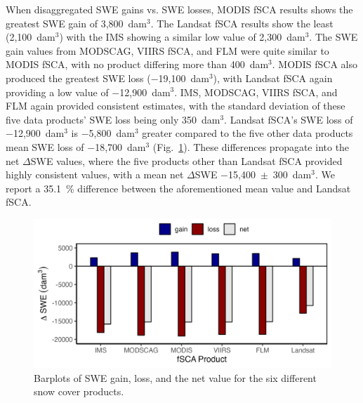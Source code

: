 \clearpage
When disaggregated SWE gains vs. SWE losses, MODIS fSCA results shows the greatest SWE gain of 3,800~dam$^{3}$. The Landsat fSCA results show the least (2,100~dam$^{3}$) with the IMS showing a similar low value of 2,300~dam$^{3}$. The SWE gain values from MODSCAG, VIIRS fSCA, and FLM were quite similar to MODIS fSCA, with no product differing more than 400~dam$^{3}$.
MODIS fSCA also produced the greatest SWE loss ($-$19,100~dam$^{3}$), with Landsat fSCA again providing a low value of $-$12,900~dam$^{3}$. IMS, MODSCAG, VIIRS fSCA, and FLM again provided consistent estimates, with the standard deviation of these five data products' SWE loss being only 350~dam$^{3}$. Landsat fSCA's SWE loss of $-$12,900~dam$^{3}$ is $-$5,800~dam$^{3}$ greater compared to the five other data products mean SWE loss of $-$18,700~dam$^{3}$ (Fig.~\ref{fig:dswe_bar_graph}). These differences propagate into the net $\Delta$SWE values, where the five products other than Landsat fSCA provided highly consistent values, with a mean net $\Delta$SWE $-$15,400~$\pm$~300~dam$^{3}$. We report a 35.1~\% difference between the aforementioned mean value and Landsat fSCA.


\begin{figure}[]
\centering
\includegraphics[width=\textwidth]{figures/ch4_figs/dswe_stats_dam3_v1.png}
\caption{Barplots of SWE gain, loss, and the net value for the six different snow cover products.}
\label{fig:dswe_bar_graph}
\end{figure}

